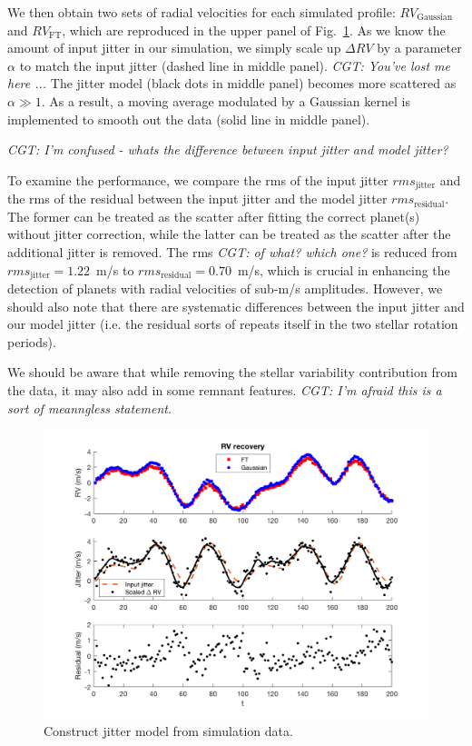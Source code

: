 We then obtain two sets of radial velocities for each simulated profile: 
$RV_\text{Gaussian}$ and $RV_\text{FT}$, which are reproduced in the upper panel of Fig.~\ref{fig:PLANET_AND_JITTER}. 
As we know the amount of input jitter in our simulation, we simply scale up $\Delta RV$ by a parameter $\alpha$
to match the input jitter (dashed line in middle panel). {\em CGT: You've lost me here ...}
The jitter model (black dots in middle panel) becomes more scattered as $\alpha \gg 1$.  
As a result, a moving average modulated by a Gaussian kernel is implemented to smooth out the data (solid line 
in middle panel).

{\em CGT: I'm confused - whats the difference between input jitter and model jitter?}

To examine the performance, we compare the rms of the input jitter $rms_\text{jitter}$
and the rms of the residual between the input jitter and the model jitter $rms_\text{residual}$. 
The former can be treated as the scatter after fitting the correct planet(s) without jitter correction, 
while the latter can be treated as the scatter after the additional jitter is removed.
The rms {\em CGT: of what? which one?} is reduced from $rms_\text{jitter} = 1.22$~m/s to $rms_\text{residual} = 0.70$~m/s,
which is crucial in enhancing the detection of planets with radial velocities of sub-m/s amplitudes. 
However, we should also note that there are systematic differences between the input jitter and our model jitter
(i.e. the residual sorts of repeats itself in the two stellar rotation periods). 

We should be aware that 
while removing the stellar variability contribution from the data, it may also add in some remnant features. 
{\em CGT: I'm afraid this is a sort of meanngless statement}.

\begin{figure}[tbp]
\centering
\includegraphics[width = 0.99 \linewidth]
{./Figures/Methods/5-PLANET_AND_JITTER.png}
\caption[Jitter model]
{Construct jitter model from simulation data.}
\label{fig:PLANET_AND_JITTER}
\end{figure} 


